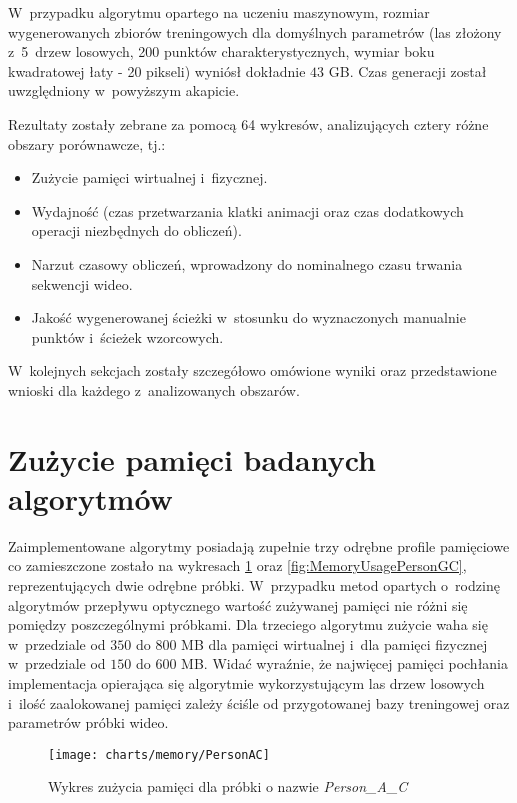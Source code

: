     W~przypadku algorytmu opartego na uczeniu maszynowym, rozmiar wygenerowanych zbiorów treningowych dla domyślnych parametrów (las złożony z~5~drzew losowych, 200 punktów charakterystycznych, wymiar boku kwadratowej łaty - 20 pikseli) wyniósł dokładnie $43$ GB. Czas generacji został uwzględniony w~powyższym akapicie.

    Rezultaty zostały zebrane za pomocą 64 wykresów, analizujących cztery różne obszary porównawcze, tj.:
      \begin{itemize}
        \item Zużycie pamięci wirtualnej i~fizycznej.
        \item Wydajność (czas przetwarzania klatki animacji oraz czas dodatkowych operacji niezbędnych do obliczeń).
        \item Narzut czasowy obliczeń, wprowadzony do nominalnego czasu trwania sekwencji wideo.
        \item Jakość wygenerowanej ścieżki w~stosunku do wyznaczonych manualnie punktów i~ścieżek wzorcowych.
      \end{itemize}

    W~kolejnych sekcjach zostały szczegółowo omówione wyniki oraz przedstawione wnioski dla każdego z~analizowanych obszarów.

  \section{Zużycie pamięci badanych algorytmów}\label{Section_Memory}

    Zaimplementowane algorytmy posiadają zupełnie trzy odrębne profile pamięciowe co zamieszczone zostało na wykresach \ref{fig:MemoryUsagePersonAC} oraz \ref{fig:MemoryUsagePersonGC}, reprezentujących dwie odrębne próbki. W~przypadku metod opartych o~rodzinę algorytmów przepływu optycznego wartość zużywanej pamięci nie różni się pomiędzy poszczególnymi próbkami. Dla trzeciego algorytmu zużycie waha się w~przedziale od $350$ do $800$ MB dla pamięci wirtualnej i~dla pamięci fizycznej w~przedziale od $150$ do $600$ MB. Widać wyraźnie, że najwięcej pamięci pochłania implementacja opierająca się algorytmie wykorzystującym las drzew losowych i~ilość zaalokowanej pamięci zależy ściśle od przygotowanej bazy treningowej oraz parametrów próbki wideo.

      \begin{figure}[!ht]
        \centering
        \texttt{[image: charts/memory/PersonAC]}
        \caption[Wykres zużycia pamięci dla próbki o nazwie Person\_A\_C]
                {Wykres zużycia pamięci dla próbki o nazwie \textit{Person\_A\_C}}
        \label{fig:MemoryUsagePersonAC}
      \end{figure}

